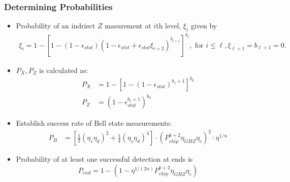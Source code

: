 \documentclass[aspectratio=169,xcolor=dvipsnames]{beamer}
\begin{document}
    \begin{frame}
    \frametitle{Determining Probabilities}
    \begin{itemize}
        \item Probability of an indriect $Z$ masurement at $i$th level, $\xi_i$ given by
        \begin{align*}
            \xi_i = 1 - [1- (1-\epsilon_{stat})(1-\epsilon_{stat}+\epsilon_{stat}\xi_{i+2})^{b_{i+1}}]^{b_i}, \text{ for } i \le \ell, 
            \xi_{\ell+1}=b_{\ell+1}=0.
        \end{align*}
        \item $P_X,P_Z$ is calculated as:
        \begin{align*}
           P_X &= 1 - [1-(1-\epsilon_{stat})^{b_1+1}]^{b_0} \\
            P_Z &= (1 - \epsilon_{stat}^{b_1+1})^{b_0} 
        \end{align*}
        \item Establish success rate of Bell state measurements:
        \begin{align*}
            P_B &= \left[\frac{1}{2}(\eta_s\eta_d)^2 + \frac{1}{4}(\eta_s\eta_d)^4\right] \cdot \left(P_{chip}^{k+2}\eta_{GHZ}\eta_c\right)^2 \cdot \eta^{1/n}
        \end{align*}
        \item Probability of at least one successful detection at ends is 
        \begin{equation*}
            P_{end} = 1 - (1-\eta^{1/(2n)}P_{chip}^{k+2}\eta_{GHZ}\eta_c)
        \end{equation*}
    \end{itemize}
    \end{frame}
\end{document}
